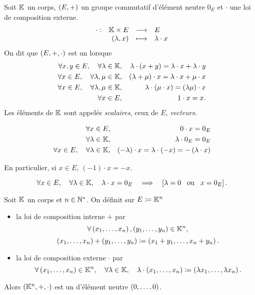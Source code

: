 \documentclass{magnolia}
\begin{document}
\begin{definition}[utile=-3]
Soit $\mathbb{K}$ un corps, $\left(E,+\right)$ un groupe commutatif d'élément neutre $0_E$ et
$\cdot$ une loi de composition externe.
\[\begin{array}[t]{lrcl} \displaystyle{\cdot} : & \displaystyle{\ensuremath{\mathbb{K}}\times E} & \longrightarrow & \displaystyle{E} \\ & \displaystyle{\left(\lambda,x\right)} & \longmapsto & \displaystyle{\lambda\cdot x} \end{array}\]
On dit que $\left(E,+,\cdot\right)$ est un \emph{\Kev} lorsque
\begin{eqnarray*}
\forall x,y\in E ,\quad \forall \lambda\in\mathbb{K}, & &
  \lambda\cdot\left(x+y\right)=\lambda\cdot x+\lambda\cdot y\\
\forall x\in E ,\quad \forall \lambda,\mu\in\mathbb{K}, & &
  \left(\lambda+\mu\right)\cdot x=\lambda\cdot x+\mu\cdot x\\
\forall x\in E ,\quad \forall \lambda,\mu\in\mathbb{K}, & &
  \lambda\cdot\left(\mu\cdot x\right)=\left(\lambda\mu\right)\cdot x\\
\forall x\in E, & & 1\cdot x=x.
\end{eqnarray*}
Les éléments de $\mathbb{K}$ sont appelés \emph{scalaires}, ceux de $E$, \emph{vecteurs}.
\end{definition}

\begin{proposition}[utile=-3]
\begin{eqnarray*}
\forall x\in E,& & 0\cdot x=0_E\\
\forall \lambda\in\mathbb{K}, & & \lambda\cdot 0_E=0_E\\
\forall x\in E ,\quad \forall \lambda\in\mathbb{K}, & &
  \left(-\lambda\right)\cdot x=\lambda\cdot\left(-x\right)=-\left(\lambda\cdot x\right)
\end{eqnarray*}
\end{proposition}

\begin{remarqueUnique}
\remarque[utile=-1] En particulier, si $x\in E$, $(-1)\cdot x=-x$.
\end{remarqueUnique}

\begin{proposition}[utile=1]
\[\forall x\in E ,\quad \forall \lambda\in\mathbb{K} ,\quad
  \lambda\cdot x=0_E \quad\Longrightarrow\quad \left[\lambda=0 \quad\!\text{ou}\quad\! x=0_E\right].\]  
\end{proposition}

\begin{definition}[utile=-3]
Soit $\mathbb{K}$ un corps et $n\in{\mathbb{N}^*}$. On définit sur $E\coloneqq\mathbb{K}^n$
\begin{itemize}
\item la loi de composition interne $+$ par
  \[\forall \left(x_1,\ldots,x_n\right),\left(y_1,\ldots,y_n\right)\in\mathbb{K}^n,\]
  \[\left(x_1,\ldots,x_n\right)+\left(y_1,\ldots,y_n\right)\coloneqq\left(x_1+y_1,\ldots,x_n+y_n\right).\]
\item la loi de composition externe $\cdot$ par
  \[\forall \left(x_1,\ldots,x_n\right)\in\mathbb{K}^n ,\quad \forall \lambda\in\mathbb{K} ,\quad
    \lambda\cdot\left(x_1,\ldots,x_n\right)\coloneqq\left(\lambda x_1,\ldots,\lambda x_n\right).\]
\end{itemize}
Alors $\left(\mathbb{K}^n,+,\cdot\right)$ est un \Kev d'élément neutre $\left(0,\ldots,0\right)$.
\end{definition}
\end{document}
